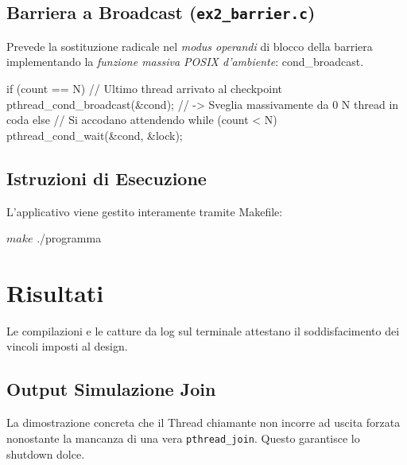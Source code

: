 \documentclass[a4paper,12pt]{article}
\begin{document}
\subsection{Barriera a Broadcast (\texttt{ex2\_barrier.c})}
Prevede la sostituzione radicale nel \textit{modus operandi} di blocco della barriera implementando la \textit{funzione massiva POSIX d'ambiente}: cond\_broadcast.
\begin{ccode}
if (count == N) {
    // Ultimo thread arrivato al checkpoint
    pthread_cond_broadcast(&cond); // -> Sveglia massivamente da 0 N thread in coda
} else {
    // Si accodano attendendo
    while (count < N) {
        pthread_cond_wait(&cond, &lock);
    }
}
\end{ccode}


\subsection{Istruzioni di Esecuzione}
L'applicativo viene gestito interamente tramite Makefile:
\begin{terminal}
$ make
$ ./programma
\end{terminal}

\section{Risultati}
Le compilazioni e le catture da log sul terminale attestano il soddisfacimento dei vincoli imposti al design.

\subsection{Output Simulazione Join}
La dimostrazione concreta che il Thread chiamante non incorre ad uscita forzata nonostante la mancanza di una vera \texttt{pthread\_join}. Questo garantisce lo shutdown dolce.
\end{document}
